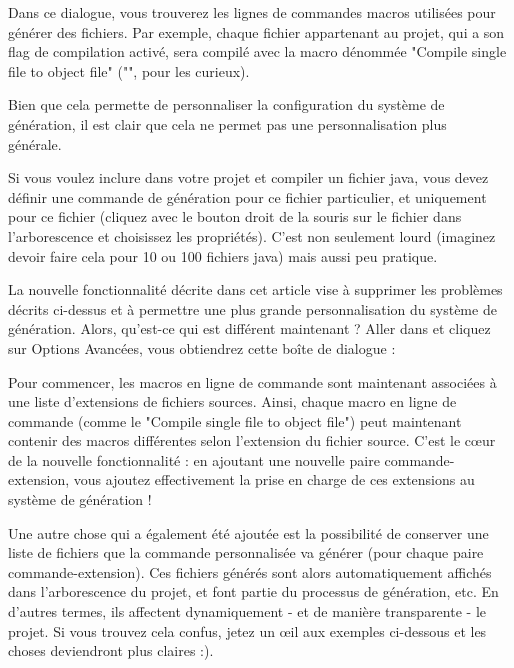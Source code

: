 Dans ce dialogue, vous trouverez les lignes de commandes macros utilisées pour générer des fichiers. Par exemple, chaque fichier appartenant au projet, qui a son flag de compilation activé, sera compilé avec la macro dénommée "Compile single file to object file" ("", pour les curieux).\


Bien que cela permette de personnaliser la configuration du système de génération, il est clair que cela ne permet pas une personnalisation plus générale.\

Si vous voulez inclure dans votre projet et compiler un fichier java, vous devez définir une commande de génération pour ce fichier particulier, et uniquement pour ce fichier (cliquez avec le bouton droit de la souris sur le fichier dans l'arborescence et choisissez les propriétés). C'est non seulement lourd (imaginez devoir faire cela pour 10 ou 100 fichiers java) mais aussi peu pratique.\


La nouvelle fonctionnalité décrite dans cet article vise à supprimer les problèmes décrits ci-dessus et à permettre une plus grande personnalisation du système de génération. Alors, qu'est-ce qui est différent maintenant ? Aller dans  et cliquez sur Options Avancées, vous obtiendrez cette boîte de dialogue : 


Pour commencer, les macros en ligne de commande sont maintenant associées à une liste d'extensions de fichiers sources. Ainsi, chaque macro en ligne de commande (comme le "Compile single file to object file") peut maintenant contenir des macros différentes selon l'extension du fichier source. C'est le cœur de la nouvelle fonctionnalité : en ajoutant une nouvelle paire commande-extension, vous ajoutez effectivement la prise en charge de ces extensions au système de génération !

Une autre chose qui a également été ajoutée est la possibilité de conserver une liste de fichiers que la commande personnalisée va générer (pour chaque paire commande-extension). Ces fichiers générés sont alors automatiquement affichés dans l'arborescence du projet, et font partie du processus de génération, etc. En d'autres termes, ils affectent dynamiquement - et de manière transparente - le projet. Si vous trouvez cela confus, jetez un œil aux exemples ci-dessous et les choses deviendront plus claires :).\

